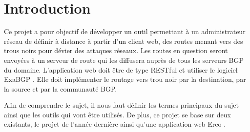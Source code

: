 \chapter{Introduction}


Ce projet a pour objectif de développer un outil permettant à un administrateur réseau de définir à distance à partir d'un client web, des routes menant vers des trous noirs pour dévier des attaques réseaux. Les routes en question seront envoyées à un serveur de route qui les diffusera auprès de tous les serveurs BGP du domaine. L'application web doit être de type RESTful et utiliser le logiciel ExaBGP \cite{Exa13}. Elle doit implémenter le routage vers trou noir par la destination, par la source et par la communauté BGP.

Afin de comprendre le sujet, il nous faut définir les termes principaux du sujet ainsi que les outils qui vont être utilisés. De plus, ce projet se base sur deux existants, le projet de l'année dernière \cite{PMCB18} ainsi qu'une application web Erco \cite{Erc16}.